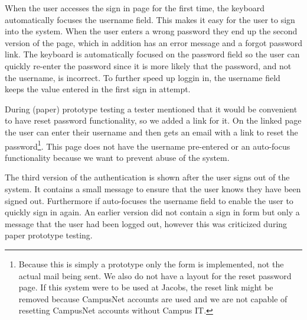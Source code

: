 When the user accesses the sign in page for the first time, the keyboard automatically focuses the username field. This makes it easy for the user to sign into the system. When the user enters a wrong password they end up the second version of the page, which in addition has an error message and a forgot password link. The keyboard is automatically focused on the password field so the user can quickly re-enter the password since it is more likely that the password, and not the username, is incorrect. To further speed up loggin in, the username field keeps the value entered in the first sign in attempt.

During (paper) prototype testing a tester mentioned that it would be convenient to have reset password functionality, so we added a link for it.  On the linked page the user can enter their username and then gets an email with a link to reset the password\footnote{Because this is simply a prototype only the form is implemented, not the actual mail being sent. We also do not have a layout for the reset password page. If this system were to be used at Jacobs, the reset link might be removed because CampusNet accounts are used and we are not capable of resetting CampusNet accounts without Campus IT.}. This page does not have the username pre-entered or an auto-focus functionality because we want to prevent abuse of the system.

The third version of the authentication is shown after the user signs out of the system. It contains a small message to ensure that the user knows they have been signed out. Furthermore if auto-focuses the username field to enable the user to quickly sign in again. An earlier version did not contain a sign in form but only a message that the user had been logged out, however this was criticized during paper prototype testing. 
